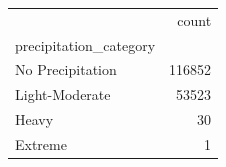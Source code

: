 \begin{tabular}{lr}
\toprule
 & count \\
precipitation_category &  \\
\midrule
No Precipitation & 116852 \\
Light-Moderate & 53523 \\
Heavy & 30 \\
Extreme & 1 \\
\bottomrule
\end{tabular}
